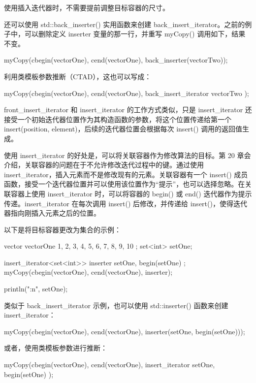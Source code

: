 使用插入迭代器时，不需要提前调整目标容器的尺寸。

还可以使用 std::back\_inserter() 实用函数来创建 back\_insert\_iterator。之前的例子中，可以删除定义 inserter 变量的那一行，并重写 myCopy() 调用如下，结果不变。

\begin{cpp}
myCopy(cbegin(vectorOne), cend(vectorOne), back_inserter(vectorTwo));
\end{cpp}

利用类模板参数推断（CTAD），这也可以写成：

\begin{cpp}
myCopy(cbegin(vectorOne), cend(vectorOne), back_insert_iterator { vectorTwo });
\end{cpp}

front\_insert\_iterator 和 insert\_iterator 的工作方式类似，只是 insert\_iterator 还接受一个初始迭代器位置作为其构造函数的参数，将这个位置传递给第一个 insert(position, element)，后续的迭代器位置会根据每次 insert() 调用的返回值生成。

使用 insert\_iterator 的好处是，可以将关联容器作为修改算法的目标。第 20 章会介绍，关联容器的问题在于不允许修改迭代过程中的键。通过使用 insert\_iterator，插入元素而不是修改现有的元素。关联容器有一个 insert() 成员函数，接受一个迭代器位置并可以使用该位置作为“提示”，也可以选择忽略。在关联容器上使用 insert\_iterator 时，可以将容器的 begin() 或 end() 迭代器作为提示传递。insert\_iterator 在每次调用 insert() 后修改，并传递给 insert()，使得迭代器指向刚插入元素之后的位置。

以下是将目标容器更改为集合的示例：

\begin{cpp}
vector vectorOne { 1, 2, 3, 4, 5, 6, 7, 8, 9, 10 };
set<int> setOne;

insert_iterator<set<int>> inserter { setOne, begin(setOne) };
myCopy(cbegin(vectorOne), cend(vectorOne), inserter);

println("{:n}", setOne);
\end{cpp}

类似于 back\_insert\_iterator 示例，也可以使用 std::inserter() 函数来创建 insert\_iterator：

\begin{cpp}
myCopy(cbegin(vectorOne), cend(vectorOne), inserter(setOne, begin(setOne)));
\end{cpp}

或者，使用类模板参数进行推断：

\begin{cpp}
myCopy(cbegin(vectorOne), cend(vectorOne),
    insert_iterator { setOne, begin(setOne) });
\end{cpp}

